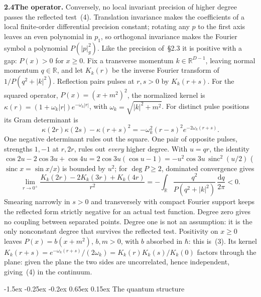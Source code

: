 \documentclass[10pt,a4paper]{article}
\makeatletter
\renewcommand\section{\@startsection{section}{1}{\z@}%
  {-1.5ex \@plus -0.25ex \@minus -0.2ex}%
  {0.65ex \@plus 0.15ex}%
  {\normalfont\large\bfseries}}
\newcommand{\dd}{\mathrm{d}}
\newcommand{\R}{\mathbb{R}}
\newcommand{\sinc}{\operatorname{sinc}}
\makeatother
\begin{document}
\vspace{3pt}
\noindent\textbf{2.4\enspace The operator.} Conversely, no local invariant precision of higher degree passes the reflected test~(4).
\newpage
\noindent Translation invariance makes the coefficients of a local finite-order differential precision constant; rotating any $p$ to the first axis leaves an even polynomial in $p_1$, so orthogonal invariance makes the Fourier symbol a polynomial $P(|p|_g^2)$. Like the precision of~\S2.3 it is positive with a gap: $P(x) > 0$ for $x \ge 0$. Fix a transverse momentum $k \in \R^{D-1}$, leaving normal momentum $q \in \R$, and let $K_k(r)$ be the inverse Fourier transform of $1/P(q^2 + |k|^2)$. Reflection pairs pulses at $r, s > 0$ by $K_k(r + s)$. For the squared operator, $P(x) = (x + m^2)^2$, the normalized kernel is $\kappa(r) = (1 + \omega_k|r|)e^{-\omega_k|r|}$, with $\omega_k = \sqrt{|k|^2 + m^2}$. For distinct pulse positions its Gram determinant is
\begin{equation}
  \kappa(2r)\kappa(2s) - \kappa(r + s)^2 = -\omega_k^2(r - s)^2 e^{-2\omega_k(r+s)}.
\end{equation}
One negative determinant rules out the square. One pair of opposite pulses, strengths $1, -1$ at $r, 2r$, rules out \textit{every} higher degree. With $u = qr$, the identity $\cos 2u - 2\cos 3u + \cos 4u = 2\cos 3u(\cos u - 1) = -u^2\cos 3u\,\sinc^2(u/2)$ ($\sinc x = \sin x / x$) is bounded by $u^2$; for $\deg P \ge 2$, dominated convergence gives
\begin{equation}
  \lim_{r\to 0^+}\frac{K_k(2r) - 2K_k(3r) + K_k(4r)}{r^2}
  = -\int_{\R}\frac{q^2}{P(q^2 + |k|^2)}\,\frac{\dd q}{2\pi} < 0.
\end{equation}
Smearing narrowly in $s > 0$ and transversely with compact Fourier support keeps the reflected form strictly negative for an actual test function. Degree zero gives no coupling between separated points. Degree one is not an assumption: it is the only nonconstant degree that survives the reflected test. Positivity on $x \ge 0$ leaves $P(x) = b(x + m^2)$, $b, m > 0$, with $b$ absorbed in $\hbar$: this is~(3). Its kernel $K_k(r+s) = e^{-\omega_k(r+s)}/(2\omega_k) = K_k(r)K_k(s)/K_k(0)$ factors through the plane: given the plane the two sides are uncorrelated, hence independent, giving~(4) in the continuum.

\section{The quantum structure}
\end{document}
